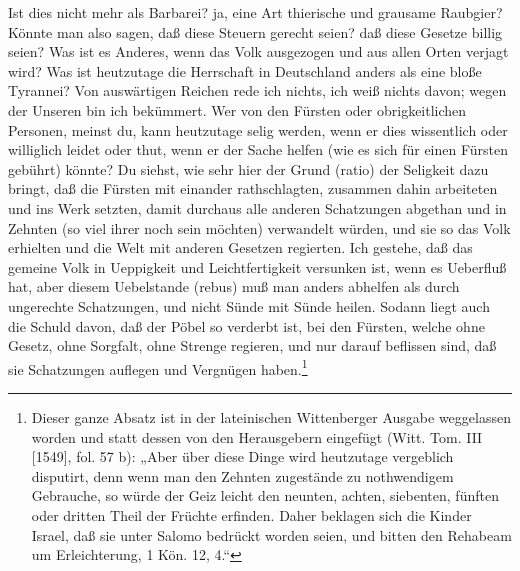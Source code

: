 Ist dies nicht mehr als Barbarei? ja, eine Art thierische und grausame Raubgier? Könnte man also sagen, daß diese Steuern gerecht seien? daß diese Gesetze billig seien? Was ist es Anderes, wenn das Volk ausgezogen und aus allen Orten verjagt wird? Was ist heutzutage die Herrschaft in Deutschland anders als eine bloße Tyrannei? Von auswärtigen Reichen rede ich nichts, ich weiß nichts davon; wegen der Unseren bin ich bekümmert. Wer von den Fürsten oder obrigkeitlichen Personen, meinst du, kann heutzutage selig werden, wenn er dies wissentlich oder williglich leidet oder thut, wenn er der Sache helfen (wie es sich für einen Fürsten gebührt) könnte? Du siehst, wie sehr hier der Grund (ratio) der Seligkeit dazu bringt, daß die Fürsten mit einander rathschlagten, zusammen dahin arbeiteten und ins Werk setzten, damit durchaus alle anderen Schatzungen abgethan und in Zehnten (so viel ihrer noch sein möchten) verwandelt würden, und sie so das Volk erhielten und die Welt mit anderen Gesetzen regierten. Ich gestehe, daß das gemeine Volk in Ueppigkeit und Leichtfertigkeit versunken ist, wenn es Ueberfluß hat, aber diesem Uebelstande (rebus) muß man anders abhelfen als durch ungerechte Schatzungen, und nicht Sünde mit Sünde heilen. Sodann liegt auch die Schuld davon, daß der Pöbel so verderbt ist, bei den Fürsten, welche ohne Gesetz, ohne Sorgfalt, ohne Strenge regieren, und nur darauf beflissen sind, daß sie Schatzungen auflegen und Vergnügen haben.\footnote{Dieser ganze Absatz ist in der lateinischen Wittenberger Ausgabe weggelassen worden und statt dessen von den Herausgebern eingefügt (Witt. Tom. III [1549], fol. 57 b): „Aber über diese Dinge wird heutzutage vergeblich disputirt, denn wenn man den Zehnten zugestände zu nothwendigem Gebrauche, so würde der Geiz leicht den neunten, achten, siebenten, fünften oder dritten Theil der Früchte erfinden. Daher beklagen sich die Kinder Israel, daß sie unter Salomo bedrückt worden seien, und bitten den Rehabeam um Erleichterung, 1 Kön. 12, 4.“}

